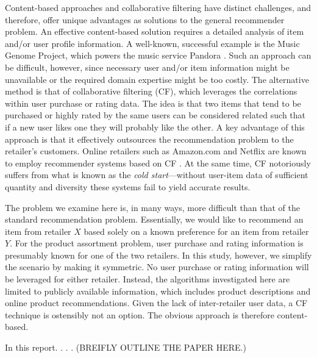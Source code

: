 \documentclass[11pt]{article}
\begin{document}
Content-based approaches and collaborative filtering have distinct challenges,
and therefore, offer unique advantages as solutions to the general recommender
problem.  An effective content-based solution requires a detailed analysis of
item and/or user profile information. A well-known, successful example is the
Music Genome Project, which powers the music service Pandora \cite{mgp}. Such an
approach can be difficult, however, since necessary user and/or item information
might be unavailable or the required domain expertise might be too costly. The
alternative method is that of collaborative filtering (CF), which leverages the
correlations within user purchase or rating data. The idea is that two items
that tend to be purchased or highly rated by the same users can be considered
related such that if a new user likes one they will probably like the other. A
key advantage of this approach is that it effectively outsources the
recommendation problem to the retailer's customers. Online retailers such as
Amazon.com and Netflix are known to employ recommender systems based on CF
\cite{Koren2009}. At the same time, CF notoriously suffers from what is known as
the {\em cold start}---without user-item data of sufficient quantity and
diversity these systems fail to yield accurate results.

The problem we examine here is, in many ways, more difficult than that of the
standard recommendation problem. Essentially, we would like to recommend an item
from retailer $X$ based solely on a known preference for an item from retailer
$Y$. For the product assortment problem, user purchase and rating information is
presumably known for one of the two retailers. In this study, however, we
simplify the scenario by making it symmetric. No user purchase or rating
information will be leveraged for either retailer. Instead, the algorithms
investigated here are limited to publicly available information, which includes
product descriptions and online product recommendations. Given the lack of
inter-retailer user data, a CF technique is ostensibly not an option. The
obvious approach is therefore content-based.

In this report. . . . (BREIFLY OUTLINE THE PAPER HERE.)
\end{document}
